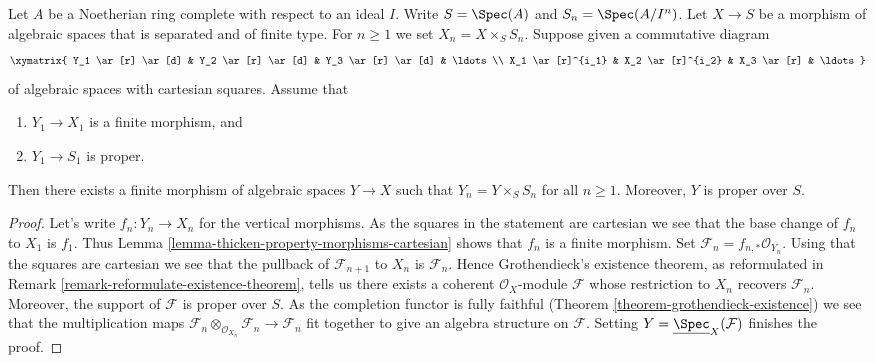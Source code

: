 \begin{lemma}
\label{lemma-algebraize-formal-algebraic-space-finite-over-proper}
Let $A$ be a Noetherian ring complete with respect to an ideal $I$.
Write $S = \Spec(A)$ and $S_n = \Spec(A/I^n)$.
Let $X \to S$ be a morphism of algebraic spaces that is separated
and of finite type.
For $n \geq 1$ we set $X_n = X \times_S S_n$.
Suppose given a commutative diagram
$$
\xymatrix{
Y_1 \ar[r] \ar[d] & Y_2 \ar[r] \ar[d] & Y_3 \ar[r] \ar[d] & \ldots \\
X_1 \ar[r]^{i_1} & X_2 \ar[r]^{i_2} & X_3 \ar[r] & \ldots
}
$$
of algebraic spaces with cartesian squares. Assume that
\begin{enumerate}
\item $Y_1 \to X_1$ is a finite morphism, and
\item $Y_1 \to S_1$ is proper.
\end{enumerate}
Then there exists a finite morphism of algebraic spaces $Y \to X$ such that
$Y_n = Y \times_S S_n$ for all $n \geq 1$. Moreover, $Y$ is proper over $S$.
\end{lemma}

\begin{proof}
Let's write $f_n : Y_n \to X_n$ for the vertical morphisms.
As the squares in the statement are cartesian
we see that the base change of $f_n$ to $X_1$ is $f_1$.
Thus Lemma \ref{lemma-thicken-property-morphisms-cartesian}
shows that $f_n$ is a finite morphism.
Set $\mathcal{F}_n = f_{n, *}\mathcal{O}_{Y_n}$.
Using that the squares are cartesian we see that
the pullback of $\mathcal{F}_{n + 1}$ to $X_n$ is $\mathcal{F}_n$.
Hence Grothendieck's existence theorem, as reformulated in
Remark \ref{remark-reformulate-existence-theorem},
tells us there exists a coherent $\mathcal{O}_X$-module $\mathcal{F}$
whose restriction to $X_n$ recovers $\mathcal{F}_n$.
Moreover, the support of $\mathcal{F}$ is proper over $S$.
As the completion functor is fully faithful
(Theorem \ref{theorem-grothendieck-existence})
we see that the multiplication maps
$\mathcal{F}_n \otimes_{\mathcal{O}_{X_n}} \mathcal{F}_n \to
\mathcal{F}_n$ fit together to give an algebra structure on $\mathcal{F}$.
Setting $Y = \underline{\Spec}_X(\mathcal{F})$ finishes the proof.
\end{proof}


